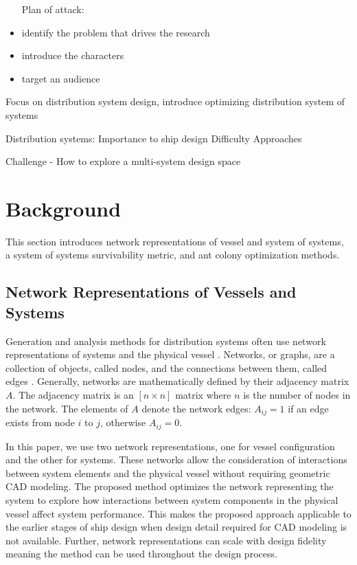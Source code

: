 \documentclass[preprint,12pt]{elsarticle}
\begin{document}
\begin{itemize}
	\item[Plan of attack:]
	\item identify the problem that drives the research
	\item introduce the characters
	\item target an audience
\end{itemize}

Focus on distribution system design, introduce optimizing distribution system of systems

Distribution systems:
Importance to ship design
Difficulty
Approaches

Challenge - How to explore a multi-system design space

\section{Background}
This section introduces network representations of vessel and system of systems, a system of systems survivability metric, and ant colony optimization methods.

\subsection{Network Representations of Vessels and Systems} 
Generation and analysis methods for distribution systems often use network representations of systems and the physical vessel \cite{Gillespie2013,Rigterink2014,Dellsy2015,Trapp2015}. Networks, or graphs, are a collection of objects, called nodes, and the connections between them, called edges \cite{Newman2003}. Generally, networks are mathematically defined by their adjacency matrix $A$. The adjacency matrix is an $[n\times n]$ matrix where $n$ is the number of nodes in the network. The elements of $A$ denote the network edges: $A_{ij}=1$ if an edge exists from node $i$ to $j$, otherwise $A_{ij}=0$.

In this paper, we use two network representations, one for vessel configuration and the other for systems. These networks allow the consideration of interactions between system elements and the physical vessel without requiring geometric CAD modeling. The proposed method optimizes the network representing the system to explore how interactions between system components in the physical vessel affect system performance. This makes the proposed approach applicable to the earlier stages of ship design when design detail required for CAD modeling is not available. Further, network representations can scale with design fidelity \cite{Rigterink2014, Gillespie2012} meaning the method can be used throughout the design process.
\end{document}
